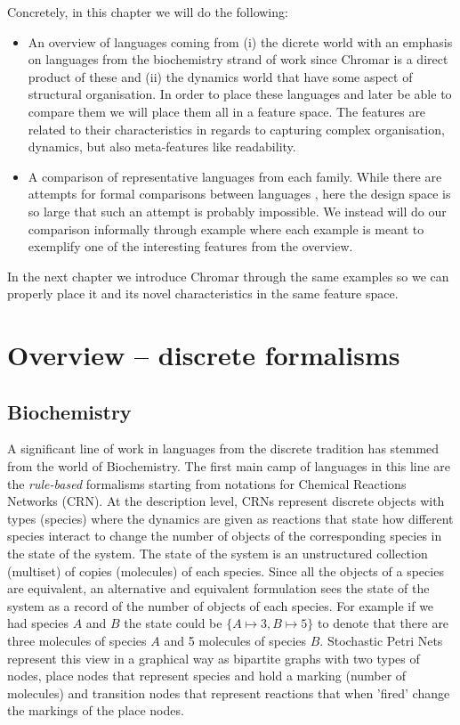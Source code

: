 \documentclass[phd]{infthesis}
\begin{document}
Concretely, in this chapter we will do the following:
\begin{itemize}
\item An overview of languages coming from (i) the dicrete world with an
emphasis on languages from the biochemistry strand of work since Chromar is a
direct product of these and (ii) the dynamics world that have some aspect of
structural organisation. In order to place these languages and later be able to
compare them we will place them all in a feature space. The features are related
to their characteristics in regards to capturing complex organisation, dynamics,
but also meta-features like readability.
\item A comparison of representative languages from each family. While there are
attempts for formal comparisons between languages
\citep{felleisen1991expressive}, here the design space is so large that such an
attempt is probably impossible. We instead will do our comparison informally
through example where each example is meant to exemplify one of the interesting
features from the overview.
\end{itemize}
In the next chapter  we introduce Chromar through the same examples so we can
properly place it and its novel characteristics in the same feature space.


\section{Overview -- discrete formalisms}

\subsection{Biochemistry}
A significant line of work in languages from the discrete tradition has stemmed
from the world of Biochemistry. The first main camp of languages in this line
are the \emph{rule-based} formalisms starting from notations for Chemical Reactions
Networks (CRN). At the description level, CRNs represent discrete objects with types
(species) where the dynamics are given as reactions that state how different
species interact to change the number of objects of the corresponding species in the state of the
system. The state of the system is an unstructured collection (multiset) of
copies (molecules) of each species. Since all the objects of a
species are equivalent, an alternative and equivalent formulation sees the state
of the system as a record of the number of objects of each species. For example
if we had species $A$ and $B$ the state could be $\{A \mapsto 3, B \mapsto 5 \}$ to denote
that there are three molecules of species $A$ and 5 molecules of species
$B$. Stochastic Petri Nets represent this view in a graphical way as bipartite graphs with
two types of nodes, place nodes that represent species and hold a marking
(number of molecules) and transition nodes that represent reactions that when
'fired' change the markings of the place nodes.
\end{document}
